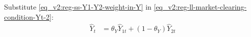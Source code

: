 \documentclass[../thesis.tex]{subfiles}
\begin{document}

Substitute \ref{eq_v2:reg-ss-Y1-Y2-weight-in-Y} in \ref{eq_v2:reg-ll-market-clearing-condition-Yt-2}:
\begin{align}
	\hat{Y}_{t} &= \theta_{Y} \hat{Y}_{1t} + (1-\theta_{Y}) \hat{Y}_{2t} \label{eq_v2:reg-ll-market-clearing-condition-Yt-3}
\end{align}


\begin{comment}
	\subsubsection*{National Price Level}
	
	Log-linearize \ref{eq_v2:reg-national-price-level}:
	\begin{alignat}{2}
		P_{t} Y_{t} &= P_{1t} Y_{1t} + P_{2t} Y_{2t} & \implies \tag{\ref{eq_v2:reg-national-price-level}} \\ 
		P Y (1 + \hat{P}_{t} + \hat{Y}_{t}) &= P_{1} Y_{1} (1 + \hat{P}_{1t} + \hat{Y}_{1t}) + P_{2} Y_{2} (1 + \hat{P}_{2t} + \hat{Y}_{2t}) &\implies \nonumber \\
		\hat{P}_{t} + \hat{Y}_{t} &= \frac{Y_{1}}{Y} (\hat{P}_{1t} + \hat{Y}_{1t}) + \frac{Y_{2}}{Y} (\hat{P}_{2t} + \hat{Y}_{2t}) \label{eq_v2:reg-ll-national-price-level}
	\end{alignat}	
	
	Substitute \ref{eq_v2:reg-ss-Y1-Y2-weight-in-Y} in \ref{eq_v2:reg-ll-national-price-level}:
	\begin{alignat}{2}
		\hat{P}_{t} + \hat{Y}_{t} &= \theta_{Y} (\hat{P}_{1t} + \hat{Y}_{1t}) + (1-\theta_{Y}) (\hat{P}_{2t} + \hat{Y}_{2t})  \label{eq_v2:reg-ll-national-price-level-2}
	\end{alignat}
	
	Subtract \ref{eq_v2:reg-ll-market-clearing-condition-Yt-3} from \ref{eq_v2:reg-ll-national-price-level-2}:
	\begin{alignat}{2}
		\hat{P}_{t} + \hat{Y}_{t} - \hat{Y}_{t} &= \theta_{Y} (\hat{P}_{1t} + \hat{Y}_{1t}) + (1-\theta_{Y}) (\hat{P}_{2t} + \hat{Y}_{2t}) - \nonumber \\ & \qquad \qquad - (\theta_{Y} \hat{Y}_{1t} + (1-\theta_{Y}) \hat{Y}_{2t}) \implies \nonumber \\
		\hat{P}_{t} &= \theta_{Y} \hat{P}_{1t} + (1-\theta_{Y}) \hat{P}_{2t} \label{eq_v2:reg-ll-national-price-level-3}
	\end{alignat}
	
\end{comment}
\end{document}
